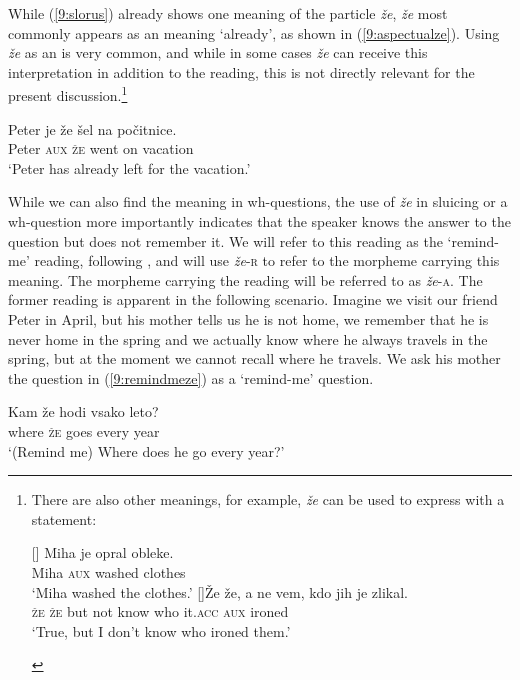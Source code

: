 \documentclass[output=paper,modfonts,newtxmath,hidelinks]{langscibook}
\begin{document}
\noindent While (\ref{9:slorus}) already shows one meaning of the particle \textit{že}, \textit{že} most commonly appears as an   meaning `already', as shown in (\ref{9:aspectualze}). Using \textit{že} as an   is very common, and while in some cases \textit{že} can receive this interpretation in addition to the  reading, this is not directly relevant for the present discussion.\footnote{There are also other meanings, for example, \textit{že} can be used to express  with a statement:

\ea
\begin{xlist}
[]{
\gll Miha je opral obleke.\\ 
Miha \textsc{aux} washed clothes\\
\glt `Miha washed the clothes.'}
[]{\gll Že že, a ne vem, kdo jih je zlikal.\\ 
\textsc{že} \textsc{že}	but not know who it.\textsc{acc} \textsc{aux} ironed\\
\glt `True, but I don't know who ironed them.'}
\end{xlist}
\zlast
}

\begin{exe} 
\ex \label{9:aspectualze}
\gll Peter 	je že šel na počitnice. \\
	Peter   \textsc{aux} \textsc{že} went on vacation\\
\trans `Peter has already left for the vacation.' 
\end{exe}

\noindent While we can also find the  meaning in wh-questions, the use of \textit{že} in sluicing or a wh-question more importantly indicates that the speaker knows the answer to the question but does not remember it. We will refer to this reading as the `remind-me' reading, following \cite{sauerland2014wieder}, and will use \textit{že}-\textsc{r} to refer to the morpheme carrying this meaning. The morpheme carrying the  reading will be referred to as \textit{že}-\textsc{a}. The former reading is apparent in the following scenario. Imagine we visit our friend Peter in April, but his mother tells us he is not home, we remember that he is never home in the spring and we actually know where he always travels in the spring, but at the moment we cannot recall where he travels. We ask his mother the question in (\ref{9:remindmeze}) as a `remind-me' question.

\begin{exe}
\ex \label{9:remindmeze}
\gll Kam že hodi vsako leto?\\
	where \textsc{že} goes every year\\
	\trans `(Remind me) Where does he go every year?'
\end{exe}
\end{document}
